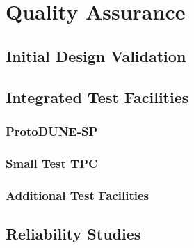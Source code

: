 \section{Quality Assurance}
\label{sec:fdsp-tpcelec-qa}

\subsection{Initial Design Validation}
\label{sec:fdsp-tpcelec-qa-initial}

\subsection{Integrated Test Facilities}
\label{sec:fdsp-tpcelec-qa-facilities}

\subsubsection{ProtoDUNE-SP}
\label{sec:fdsp-tpcelec-qa-facilities-pdune}

\subsubsection{Small Test TPC}
\label{sec:fdsp-tpcelec-qa-facilities-testtpc}

\subsubsection{Additional Test Facilities}
\label{sec:fdsp-tpcelec-qa-facilities-additional}

\subsection{Reliability Studies}
\label{sec:fdsp-tpcelec-qa-reliability}
